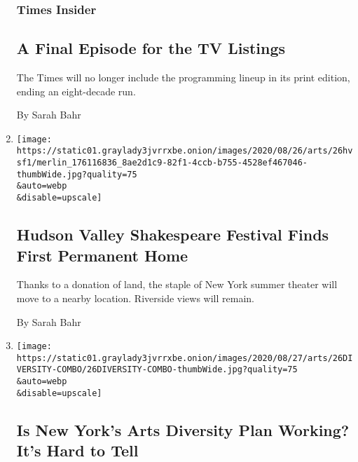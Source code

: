 \begin{enumerate}
  \hypertarget{times-insider}{%
  \subsubsection{Times Insider}\label{times-insider}}

  \hypertarget{a-final-episode-for-the-tv-listings}{%
  \subsection{A Final Episode for the TV
  Listings}\label{a-final-episode-for-the-tv-listings}}

  The Times will no longer include the programming lineup in its print
  edition, ending an eight-decade run.

  By Sarah Bahr
\item
  \href{/2020/08/26/theater/hudson-valley-shakespeare-festival-moving.html}{}

  \texttt{[image: https://static01.graylady3jvrrxbe.onion/images/2020/08/26/arts/26hvsf1/merlin\_176116836\_8ae2d1c9-82f1-4ccb-b755-4528ef467046-thumbWide.jpg?quality=75\\\&auto=webp\\\&disable=upscale]}

  \hypertarget{hudson-valley-shakespeare-festival-finds-first-permanent-home}{%
  \subsection{Hudson Valley Shakespeare Festival Finds First Permanent
  Home}\label{hudson-valley-shakespeare-festival-finds-first-permanent-home}}

  Thanks to a donation of land, the staple of New York summer theater
  will move to a nearby location. Riverside views will remain.

  By Sarah Bahr
\item
  \href{/2020/08/26/arts/design/diversity-new-york-culture-plans.html}{}

  \texttt{[image: https://static01.graylady3jvrrxbe.onion/images/2020/08/27/arts/26DIVERSITY-COMBO/26DIVERSITY-COMBO-thumbWide.jpg?quality=75\\\&auto=webp\\\&disable=upscale]}

  \hypertarget{is-new-yorks-arts-diversity-plan-working-its-hard-to-tell}{%
  \subsection{Is New York's Arts Diversity Plan Working? It's Hard to
  Tell}\label{is-new-yorks-arts-diversity-plan-working-its-hard-to-tell}}


\end{enumerate}

